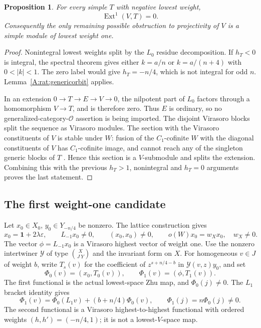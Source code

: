 \documentclass[11pt]{article}
\newtheorem{proposition}[theorem]{Proposition}
\newcommand{\one}{\mathbf1}\newcommand{\D}{\mathcal D}\newcommand{\Dcat}{\mathcal D}
\newcommand{\Ext}{\operatorname{Ext}}\newcommand{\wt}{\operatorname{wt}}
\numberwithin{equation}{section}
\begin{document}
\begin{proposition}\label{A:rat:negativeext}
For every simple $T$ with negative lowest weight,
\[
 \Ext^1(V,T)=0.
\]
Consequently the only remaining possible obstruction to projectivity of $V$ is a simple module of lowest weight one.
\end{proposition}
\begin{proof}
Nonintegral lowest weights split by the $L_0$ residue decomposition. If $h_T<0$ is integral, the spectral theorem gives either $k=a/n$ or $k=a/(n+4)$ with $0<|k|<1$. The zero label would give $h_T=-n/4$, which is not integral for odd $n$. Lemma~\ref{A:rat:genericorbit} applies.

In an extension $0\to T\to E\to V\to0$, the nilpotent part of $L_0$ factors through a homomorphism $V\to T$, and is therefore zero. Thus $E$ is ordinary, so no generalized-category-$\mathcal O$ assertion is being imported. The disjoint Virasoro blocks split the sequence as Virasoro modules. The section with the Virasoro constituents of $V$ is stable under $W$: fusion of the $C_1$-cofinite $W$ with the diagonal constituents of $V$ has $C_1$-cofinite image, and cannot reach any of the singleton generic blocks of $T$ \cite{A:CJORY}. Hence this section is a $V$-submodule and splits the extension. Combining this with the previous $h_T>1$, nonintegral and $h_T=0$ arguments proves the last statement.
\end{proof}

\subsection{The first weight-one candidate}
Let $x_0\in X_0$, $y_0\in Y_{-n/4}$ be nonzero. The lattice construction gives
\[
 x_0=\one+2\lambda\varepsilon,\qquad
 L_{-1}x_0\ne0,\qquad (x_0,x_0)\ne0,
 \qquad o(W)x_0=w_Xx_0,\quad w_X\ne0.
\]
The vector $\phi=L_{-1}x_0$ is a Virasoro highest vector of weight one. Use the nonzero intertwiner $\mathcal Y$ of type $\binom X{J\ Y}$ and the invariant form on $X$. For homogeneous $v\in J$ of weight $b$, write $T_s(v)$ for the coefficient of $z^{s+n/4-b}$ in $\mathcal Y(v,z)y_0$, and set
\[
 \Phi_0(v)=(x_0,T_0(v)),\qquad
 \Phi_1(v)=(\phi,T_1(v)).
\]
The first functional is the actual lowest-space Zhu map, and $\Phi_0(j)\ne0$. The $L_1$ bracket identity gives
\begin{equation}\label{A:rat:Phi}
 \Phi_1(v)=\Phi_0(L_1v)+(b+n/4)\Phi_0(v),
 \qquad \Phi_1(j)=n\Phi_0(j)\ne0.
\end{equation}
The second functional is a Virasoro highest-to-highest functional with ordered weights $(h,h')=(-n/4,1)$; it is not a lowest-$V$-space map.
\end{document}
